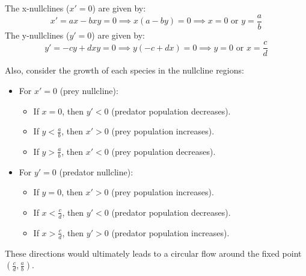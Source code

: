\documentclass[11pt]{article}
\begin{document}
\begin{example}
    The x-nullclines ($x' = 0$) are given by:
    $$x' = ax - bxy = 0 \implies x(a - by) = 0 \implies x = 0 \text{ or } y = \frac{a}{b}$$
    The y-nullclines ($y' = 0$) are given by:
    $$y' = -cy + dxy = 0 \implies y(-c + dx) = 0 \implies y = 0 \text{ or } x = \frac{c}{d}$$

    Also, consider the growth of each species in the nullcline regions:
    \begin{itemize}
        \item For \( x' = 0 \) (prey nullcline):
        \begin{itemize}
            \item If \( x = 0 \), then \( y' < 0 \) (predator population decreases).
            \item If \( y < \frac{a}{b} \), then \( x' > 0 \) (prey population increases).
            \item If \( y > \frac{a}{b} \), then \( x' < 0 \) (prey population decreases).
        \end{itemize}
        \item For \( y' = 0 \) (predator nullcline):
        \begin{itemize}
            \item If \( y = 0 \), then \( x' > 0 \) (prey population increases).
            \item If \( x < \frac{c}{d} \), then \( y' < 0 \) (predator population decreases).
            \item If \( x > \frac{c}{d} \), then \( y' > 0 \) (predator population increases).
        \end{itemize}
    \end{itemize}

    These directions would ultimately leads to a circular flow around the fixed point \( \left(\frac{c}{d}, \frac{a}{b}\right) \). 


\end{example}
\end{document}
